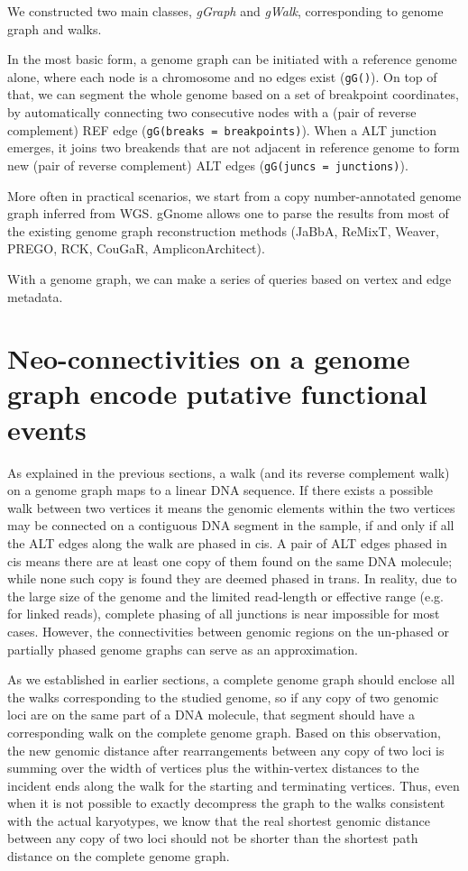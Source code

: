 \documentclass[phd,tocprelim]{cornell}
\begin{document}
We constructed two main classes, \textit{gGraph} and \textit{gWalk}, corresponding to genome graph and walks.

In the most basic form, a genome graph can be initiated with a reference genome alone, where each node is a chromosome and no edges exist (\texttt{gG()}). On top of that, we can segment the whole genome based on a set of breakpoint coordinates, by automatically connecting two consecutive nodes with a (pair of reverse complement) REF edge (\texttt{gG(breaks = breakpoints)}). When a ALT junction emerges, it joins two breakends that are not adjacent in reference genome to form new (pair of reverse complement) ALT edges (\texttt{gG(juncs = junctions)}).

More often in practical scenarios, we start from a copy number-annotated genome graph inferred from WGS. gGnome allows one to parse the results from most of the existing genome graph reconstruction methods (JaBbA, ReMixT, Weaver, PREGO, RCK, CouGaR, AmpliconArchitect). 

With a genome graph, we can make a series of queries based on vertex and edge metadata.


\section{Neo-connectivities on a genome graph encode putative functional events}
As explained in the previous sections, a walk (and its reverse complement walk) on a genome graph maps to a linear DNA sequence. If there exists a possible walk between two vertices it means the genomic elements within the two vertices may be connected on a contiguous DNA segment in the sample, if and only if all the ALT edges along the walk are phased in cis. A pair of ALT edges phased in cis means there are at least one copy of them found on the same DNA molecule; while none such copy is found they are deemed phased in trans. In reality, due to the large size of the genome and the limited read-length or effective range (e.g. for linked reads), complete phasing of all junctions is near impossible for most cases. However, the connectivities between genomic regions on the un-phased or partially phased genome graphs can serve as an approximation. 

As we established in earlier sections, a complete genome graph should enclose all the walks corresponding to the studied genome, so if any copy of two genomic loci are on the same part of a DNA molecule, that segment should have a corresponding walk on the complete genome graph. Based on this observation, the new genomic distance after rearrangements between any copy of two loci is summing over the width of vertices plus the within-vertex distances to the incident ends along the walk for the starting and terminating vertices. Thus, even when it is not possible to exactly decompress the graph to the walks consistent with the actual karyotypes, we know that the real shortest genomic distance between any copy of two loci should not be shorter than the shortest path distance on the complete genome graph.
\end{document}
